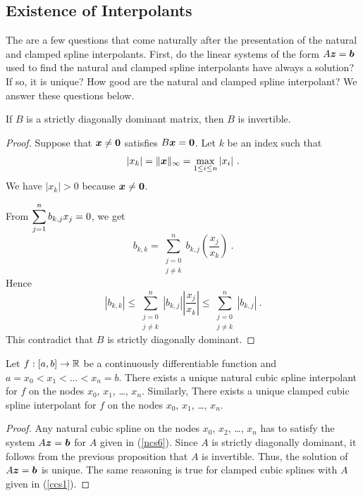 \subsection{Existence of Interpolants}

The are a few questions that come naturally after the presentation of
the natural and clamped spline interpolants.  First, do the linear
systems of the form $A\bm{z} = \bm{b}$ used to find the natural and
clamped spline interpolants have always a solution?  If so, it is
unique?  How good are the natural and clamped spline interpolant?
We answer these questions below.

\begin{prop}
If $B$ is a strictly diagonally dominant \nn matrix, then
$B$ is invertible.
\end{prop}

\begin{proof}
Suppose that $\bm{x} \neq \bm{0}$ satisfies $B\bm{x} = \bm{0}$.
Let $k$ be an index such that
\[
|x_k| = \|\bm{x}\|_\infty = \max_{1\leq i \leq n} |x_i| \ .
\]
We have $|x_k|>0$ because $\bm{x}\neq \bm{0}$.

From $\displaystyle \sum_{j=1}^n b_{k,j}x_j = 0$, we get
\[
b_{k,k} = \sum_{\substack{j=0\\j\neq k}}^n b_{k,j}
\left(\frac{x_j}{x_k}\right)  \ .
\]
Hence
\[
|b_{k,k}| \leq \sum_{\substack{j=0\\j\neq k}}^n |b_{k,j}|
\left|\frac{x_j}{x_k}\right|
\leq \sum_{\substack{j=0\\j\neq k}}^n |b_{k,j}| \  .
\]
This contradict that $B$ is strictly diagonally dominant.
\end{proof}

\begin{theorem}
Let $f:[a,b]\rightarrow \mathbb{R}$ be a continuously differentiable
function and $a = x_0 < x_1 < \ldots < x_n = b$.  There exists a
unique natural cubic spline interpolant for $f$ on the nodes $x_0$,
$x_1$, \ldots, $x_n$.  Similarly, There exists a unique clamped cubic
spline interpolant for $f$ on the nodes $x_0$, $x_1$, \ldots, $x_n$.
\end{theorem}

\begin{proof}
Any natural cubic spline on the nodes $x_0$, $x_2$, \ldots,
$x_n$ has to satisfy the system $A\bm{z} = \bm{b}$ for $A$
given in (\ref{ncs6}).  Since $A$ is strictly diagonally dominant, it
follows from the previous proposition that $A$ is invertible.  Thus,
the solution of $A\bm{z}=\bm{b}$ is unique.  The same reasoning is
true for clamped cubic splines with $A$ given in (\ref{ccs1}).
\end{proof}

